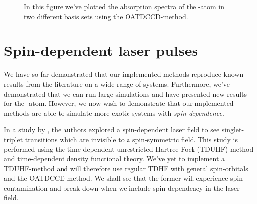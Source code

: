         \begin{figure}
            \centering
            \caption{In this figure we've plotted the absorption spectra of the
            -atom in two different basis sets using the OATDCCD-method.}
            \label{fig:ar-spectra}
        \end{figure}

    \section{Spin-dependent laser pulses}
        \label{sec:isborn}
        We have so far demonstrated that our implemented methods reproduce known
        results from the literature on a wide range of systems.
        Furthermore, we've demonstrated that we can run large simulations and
        have presented new results for the -atom.
        However, we now wish to demonstrate that our implemented methods are
        able to simulate more exotic systems with \emph{spin-dependence}.

        In a study by \citeauthor{isborn} \cite{isborn}, the authors explored a
        spin-dependent laser field to see singlet-triplet transitions which are
        invisible to a spin-symmetric field.
        This study is performed using the time-dependent unrestricted
        Hartree-Fock (TDUHF) method and time-dependent density functional theory.
        We've yet to implement a TDUHF-method and will therefore use regular
        TDHF with general spin-orbitals and the OATDCCD-method.
        We shall see that the former will experience spin-contamination and
        break down when we include spin-dependency in the laser field.

